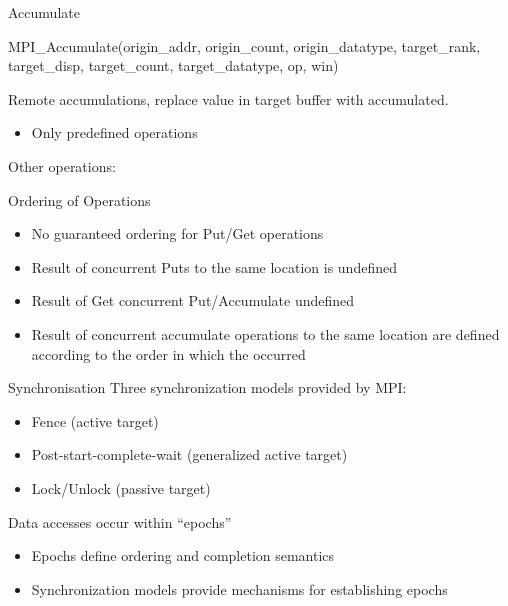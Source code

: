 \documentclass[aspectratio=43]{beamer}
\begin{document}
\begin{frame}[fragile]{Accumulate}
\begin{Pseudolisting}[]{}
MPI_Accumulate(origin_addr, origin_count, origin_datatype,
               target_rank, target_disp, target_count, 
               target_datatype, op, win)
\end{Pseudolisting}

Remote accumulations, replace value in target buffer with accumulated.

\begin{itemize}
\item Only predefined operations
\end{itemize}

Other operations: 
\end{frame}

\begin{frame}[fragile]{Ordering of Operations}
\begin{itemize}
    \item No guaranteed ordering for Put/Get operations
    \item Result of concurrent Puts to the same location is undefined
    \item Result of Get concurrent Put/Accumulate undefined
\item Result of concurrent accumulate operations to the same location are defined according to the order in which the occurred
\end{itemize}
\end{frame}

\begin{frame}[fragile]{Synchronisation}
Three synchronization models provided by MPI:
\begin{itemize}
    \item Fence (active target)
    \item Post-start-complete-wait (generalized active target)
    \item Lock/Unlock (passive target)
\end{itemize}
Data accesses occur within “epochs”
\begin{itemize}
\item Epochs define ordering and completion semantics
\item Synchronization models provide mechanisms for establishing epochs
\end{itemize}
\end{frame}
\end{document}

